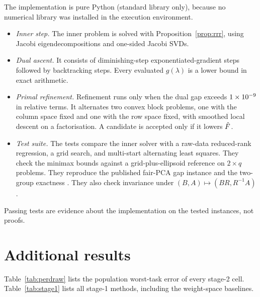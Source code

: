 The implementation is pure Python (standard library only), because no numerical library was
installed in the execution environment.
\begin{itemize}
\item \emph{Inner step.} The inner problem is solved with Proposition~\ref{prop:rrr}, using Jacobi
eigendecompositions and one-sided Jacobi SVDs.
\item \emph{Dual ascent.} It consists of \CfgDualIters{} diminishing-step exponentiated-gradient
steps followed by \CfgPolishIters{} backtracking steps. Every evaluated $g(\lambda)$ is a lower
bound in exact arithmetic.
\item \emph{Primal refinement.} Refinement runs only when the dual gap exceeds $1\times10^{-9}$ in
relative terms. It alternates two convex block problems, one with the column space fixed and one
with the row space fixed, with smoothed local descent on a factorisation. A candidate is accepted
only if it lowers $\hat{F}$.
\item \emph{Test suite.} The tests compare the inner solver with a raw-data reduced-rank
regression, a grid search, and multi-start alternating least squares. They check the minimax
bounds against a grid-plus-ellipsoid reference on $2\times q$ problems. They reproduce the
published fair-PCA gap instance \citep[Lemma~6.2]{tantipongpipat2019multicriteria} and the
two-group exactness \citep[Thm.~1.2]{tantipongpipat2019multicriteria}. They also check invariance
under $(B,A)\mapsto(BR,R^{-1}A)$.
\end{itemize}
Passing tests are evidence about the implementation on the tested instances, not proofs.

\section{Additional results}
\label{app:results}

Table~\ref{tab:perdraw} lists the population worst-task error of every stage-2 cell.
Table~\ref{tab:stage1} lists all stage-1 methods, including the weight-space baselines.

\begin{table}[!ht]
\caption{Population worst-task error $F$ for every stage-2 cell, one row per teacher and
calibration draw. ``orig.\ (seen)'' is the stage-1 draw, whose test results were seen before the
diagnostic was designed.}
\label{tab:perdraw}
\centering\small
\resizebox{\linewidth}{!}{}
\end{table}

